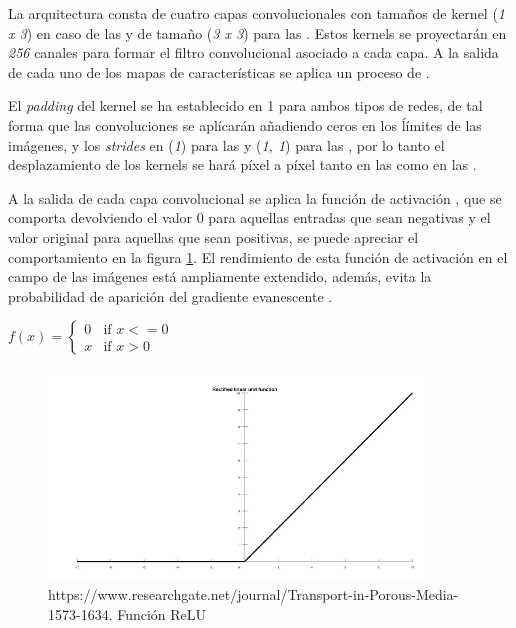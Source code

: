 \begin{enumerate}
                La arquitectura consta de cuatro capas convolucionales con tamaños de kernel (\textit{1 x 3}) en caso de las  y de tamaño (\textit{3 x 3}) para las . Estos kernels se proyectarán en \textit{256} canales para formar el filtro convolucional asociado a cada capa. A la salida de cada uno de los mapas de características se aplica un proceso de .

                El \textit{padding} del kernel se ha establecido en 1 para ambos tipos de redes, de tal forma que las convoluciones se aplícarán añadiendo ceros en los ĺímites de las imágenes, y los \textit{strides} en (\textit{1}) para las  y (\textit{1, 1}) para las , por lo tanto el desplazamiento de los kernels se hará píxel a píxel tanto en las  como en las .

                A la salida de cada capa convolucional se aplica la función de activación , que se comporta devolviendo el valor $0$ para aquellas entradas que sean negativas y el valor original para aquellas que sean positivas, se puede apreciar el comportamiento en la figura \ref{RELUImage}. El rendimiento de esta función de activación en el campo de las imágenes está ampliamente extendido, además, evita la probabilidad de aparición del gradiente evanescente \cite{GradientVanishingRelu}.

                \begin{center}
                    $f(x) = \left\{
                                   \begin{array}{lr}
                                     0 & \text{if } x<=0\\
                                     x & \text{if } x>0
                                   \end{array}
                            \right.$
                \end{center}

                \begin{figure}[h]
                    \centering
                    \includegraphics[width=10cm]{archivos/4.Metodologia/Modelos/CNN/RELUImage}
                    \caption{https://www.researchgate.net/journal/Transport-in-Porous-Media-1573-1634. Función ReLU}
                    \label{RELUImage}
                 \end{figure}


\end{enumerate}
